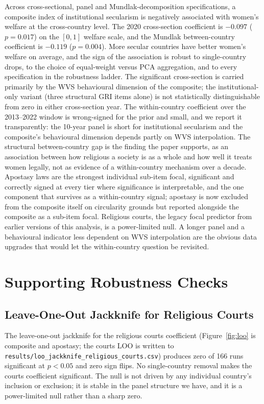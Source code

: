\documentclass[12pt,a4paper]{article}
\begin{document}
Across cross-sectional, panel and Mundlak-decomposition specifications, a composite index of institutional secularism is negatively associated with women's welfare at the cross-country level. The 2020 cross-section coefficient is $-0.097$ ($p = 0.017$) on the $[0, 1]$ welfare scale, and the Mundlak between-country coefficient is $-0.119$ ($p = 0.004$). More secular countries have better women's welfare on average, and the sign of the association is robust to single-country drops, to the choice of equal-weight versus PCA aggregation, and to every specification in the robustness ladder. The significant cross-section is carried primarily by the WVS behavioural dimension of the composite; the institutional-only variant (three structural GRI items alone) is not statistically distinguishable from zero in either cross-section year. The within-country coefficient over the 2013--2022 window is wrong-signed for the prior and small, and we report it transparently: the 10-year panel is short for institutional secularism and the composite's behavioural dimension depends partly on WVS interpolation. The structural between-country gap is the finding the paper supports, as an association between how religious a society is as a whole and how well it treats women legally, not as evidence of a within-country mechanism over a decade. Apostasy laws are the strongest individual sub-item focal, significant and correctly signed at every tier where significance is interpretable, and the one component that survives as a within-country signal; apostasy is now excluded from the composite itself on circularity grounds but reported alongside the composite as a sub-item focal. Religious courts, the legacy focal predictor from earlier versions of this analysis, is a power-limited null. A longer panel and a behavioural indicator less dependent on WVS interpolation are the obvious data upgrades that would let the within-country question be revisited.

\appendix

\section{Supporting Robustness Checks}

\subsection{Leave-One-Out Jackknife for Religious Courts}
\label{app:loo-courts}

The leave-one-out jackknife for the religious courts coefficient (Figure~\ref{fig:loo} is composite and apostasy; the courts LOO is written to \texttt{results/loo\_jackknife\_religious\_courts.csv}) produces zero of 166 runs significant at $p < 0.05$ and zero sign flips. No single-country removal makes the courts coefficient significant. The null is not driven by any individual country's inclusion or exclusion; it is stable in the panel structure we have, and it is a power-limited null rather than a sharp zero.
\end{document}
